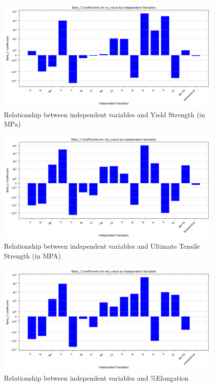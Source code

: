 \documentclass[10pt]{article}
\begin{document}
\begin{figure}[H]
    \centering
    \includegraphics[width=\imagewidth\textwidth]{figures/03_leastsq/ys_value_beta1_bar_chart.png}
    \caption{Relationship between independent variables and Yield Strength (in MPa)}
\end{figure}
\begin{figure}[H]
    \centering
    \includegraphics[width=\imagewidth\textwidth]{figures/03_leastsq/uts_value_beta1_bar_chart.png}
    \caption{Relationship between independent variables and Ultimate Tensile Strength (in MPA)}
\end{figure}
\begin{figure}[H]
    \centering
    \includegraphics[width=\imagewidth\textwidth]{figures/03_leastsq/elo_value_beta1_bar_chart.png}
    \caption{Relationship between independent variables and \%Elongation}
\end{figure}
\end{document}
